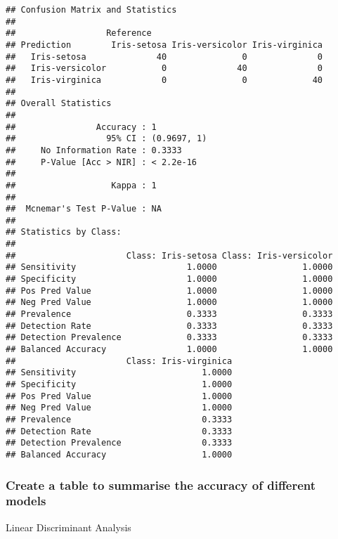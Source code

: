 \documentclass[]{article}
\newenvironment{Shaded}{\begin{snugshade}}{\end{snugshade}}
\newcommand{\KeywordTok}[1]{\textcolor[rgb]{0.13,0.29,0.53}{\textbf{#1}}}
\newcommand{\DataTypeTok}[1]{\textcolor[rgb]{0.13,0.29,0.53}{#1}}
\newcommand{\StringTok}[1]{\textcolor[rgb]{0.31,0.60,0.02}{#1}}
\newcommand{\OperatorTok}[1]{\textcolor[rgb]{0.81,0.36,0.00}{\textbf{#1}}}
\newcommand{\NormalTok}[1]{#1}
\begin{document}
\begin{verbatim}
## Confusion Matrix and Statistics
## 
##                  Reference
## Prediction        Iris-setosa Iris-versicolor Iris-virginica
##   Iris-setosa              40               0              0
##   Iris-versicolor           0              40              0
##   Iris-virginica            0               0             40
## 
## Overall Statistics
##                                      
##                Accuracy : 1          
##                  95% CI : (0.9697, 1)
##     No Information Rate : 0.3333     
##     P-Value [Acc > NIR] : < 2.2e-16  
##                                      
##                   Kappa : 1          
##                                      
##  Mcnemar's Test P-Value : NA         
## 
## Statistics by Class:
## 
##                      Class: Iris-setosa Class: Iris-versicolor
## Sensitivity                      1.0000                 1.0000
## Specificity                      1.0000                 1.0000
## Pos Pred Value                   1.0000                 1.0000
## Neg Pred Value                   1.0000                 1.0000
## Prevalence                       0.3333                 0.3333
## Detection Rate                   0.3333                 0.3333
## Detection Prevalence             0.3333                 0.3333
## Balanced Accuracy                1.0000                 1.0000
##                      Class: Iris-virginica
## Sensitivity                         1.0000
## Specificity                         1.0000
## Pos Pred Value                      1.0000
## Neg Pred Value                      1.0000
## Prevalence                          0.3333
## Detection Rate                      0.3333
## Detection Prevalence                0.3333
## Balanced Accuracy                   1.0000
\end{verbatim}

\subsubsection{Create a table to summarise the accuracy of different
models}\label{create-a-table-to-summarise-the-accuracy-of-different-models}

Linear Discriminant Analysis

\begin{Shaded}
\end{Shaded}
\end{document}
